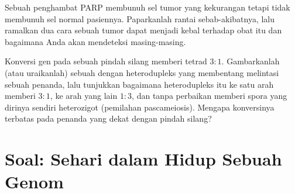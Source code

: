 \begin{exercise}[$\star\star\star$]\label{exo:b3:dna-repair:11}
Sebuah penghambat PARP membunuh sel tumor yang kekurangan \emph{} tetapi
tidak membunuh sel normal pasiennya. Paparkanlah rantai sebab-akibatnya, lalu
ramalkan dua cara sebuah tumor dapat menjadi kebal terhadap obat itu dan
bagaimana Anda akan mendeteksi masing-masing.
\end{exercise}

\begin{exercise}[$\star\star\star$]\label{exo:b3:dna-repair:12}
Konversi gen pada sebuah pindah silang memberi tetrad $3{:}1$. Gambarkanlah
(atau uraikanlah) sebuah  dengan heterodupleks yang
membentang melintasi sebuah penanda, lalu tunjukkan bagaimana  heterodupleks itu ke satu arah memberi $3{:}1$, ke arah yang lain
$1{:}3$, dan tanpa perbaikan memberi spora yang dirinya sendiri heterozigot
(pemilahan pascameiosis). Mengapa konversinya terbatas pada penanda yang dekat
dengan pindah silang?
\end{exercise}

\section{Soal: Sehari dalam Hidup Sebuah Genom}

